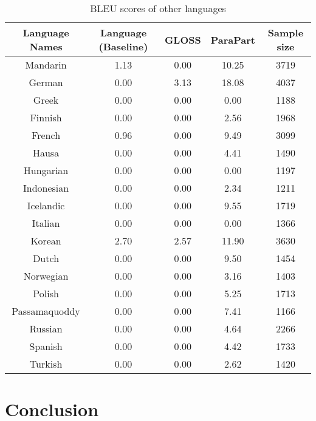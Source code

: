 \begin{table}[ht]
\centering
\begin{tabular}{ccccc}
  \hline
Language Names & Language (Baseline) & GLOSS & ParaPart & Sample size \\ 
  \hline
Mandarin & 1.13 & 0.00 & 10.25 & 3719 \\ 
  German & 0.00 & 3.13 & 18.08 & 4037 \\ 
  Greek & 0.00 & 0.00 & 0.00 & 1188 \\ 
  Finnish & 0.00 & 0.00 & 2.56 & 1968 \\ 
  French & 0.96 & 0.00 & 9.49 & 3099 \\ 
  Hausa & 0.00 & 0.00 & 4.41 & 1490 \\ 
  Hungarian & 0.00 & 0.00 & 0.00 & 1197 \\ 
  Indonesian & 0.00 & 0.00 & 2.34 & 1211 \\ 
  Icelandic & 0.00 & 0.00 & 9.55 & 1719 \\ 
  Italian & 0.00 & 0.00 & 0.00 & 1366 \\ 
  Korean & 2.70 & 2.57 & 11.90 & 3630 \\ 
  Dutch & 0.00 & 0.00 & 9.50 & 1454 \\ 
  Norwegian & 0.00 & 0.00 & 3.16 & 1403 \\ 
  Polish & 0.00 & 0.00 & 5.25 & 1713 \\ 
  Passamaquoddy & 0.00 & 0.00 & 7.41 & 1166 \\ 
  Russian & 0.00 & 0.00 & 4.64 & 2266 \\ 
  Spanish & 0.00 & 0.00 & 4.42 & 1733 \\ 
  Turkish & 0.00 & 0.00 & 2.62 & 1420 \\ 
   \hline
\end{tabular}
\caption{BLEU scores of other languages} 
\label{Table:Other_LG_BLEU}
\end{table}
\section{Conclusion}
